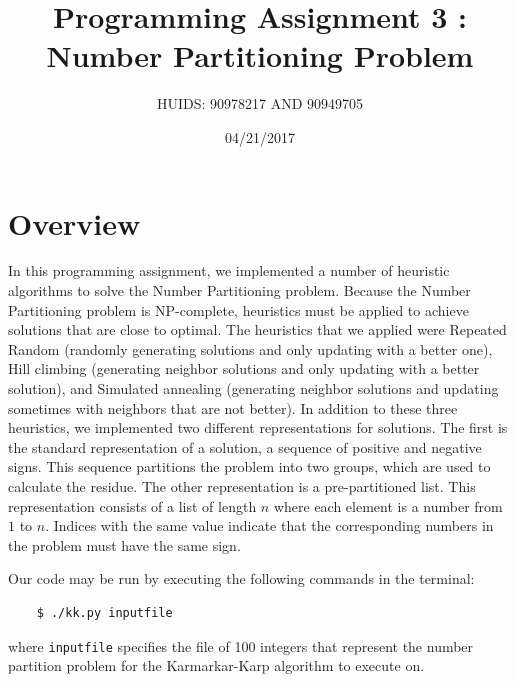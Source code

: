 \documentclass[a4paper]{article}
\title{Programming Assignment 3 : Number Partitioning Problem}
\author{HUIDS: 90978217 AND 90949705}
\date{04/21/2017}
\begin{document}
	
	\maketitle
	
	\section{Overview}
	In this programming assignment, we implemented a number of heuristic algorithms to solve the Number Partitioning problem. Because the Number Partitioning problem is NP-complete, heuristics must be applied to achieve solutions that are close to optimal. The heuristics that we applied were Repeated Random (randomly generating solutions and only updating with a better one), Hill climbing (generating neighbor solutions and only updating with a better solution), and Simulated annealing (generating neighbor solutions and updating sometimes with neighbors that are not better). In addition to these three heuristics, we implemented two different representations for solutions. The first is the standard representation of a solution, a sequence of positive and negative signs. This sequence partitions the problem into two groups, which are used to calculate the residue. The other representation is a pre-partitioned list. This representation consists of a list of length $n$ where each element is a number from $1$ to $n$. Indices with the same value indicate that the corresponding numbers in the problem must have the same sign.
	
	Our code may be run by executing the following commands in the terminal:
	\begin{verbatim}
	$ ./kk.py inputfile
	\end{verbatim}
	where \texttt{inputfile} specifies the file of 100 integers that represent the number partition problem for the Karmarkar-Karp algorithm to execute on.
	
\end{document}
